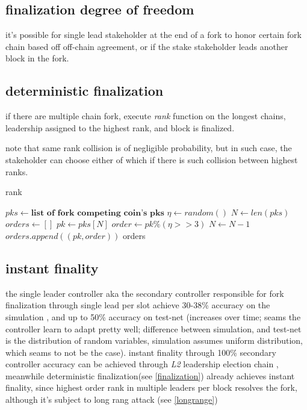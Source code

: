 \documentclass[a4paper]{article}
\begin{document}
\subsection {finalization degree of freedom}
it's possible for single lead stakeholder at the end of a fork to honor certain fork chain based off off-chain agreement, or if the stake stakeholder leads another block in the fork.

\label{finalization}
\subsection {deterministic finalization}
if there are multiple chain fork, execute \emph{rank} function on the longest chains, leadership assigned to the highest rank, and block is finalized.

note that same rank collision is of negligible probability, but in such case, the stakeholder can choose either of which if there is such collision between highest ranks.


\begin{algorithm}
\caption{rank}\label{alg:cap}
\begin{algorithmic}

\State $pks \gets \textbf{list of fork competing coin's pks}$
\State $\eta \gets random()$ 
\State $N \gets len(pks)$
\State $orders \gets []$
\State $pk \gets pks[N]$
\State $order \gets pk \% (\eta >> 3) $
\State $N \gets N-1$
\State $orders.append((pk,order))$
\EndWhile
\State \Return orders
\end{algorithmic}
\end{algorithm}


\subsection {instant finality}
the single leader controller aka the secondary controller responsible for fork finalization through single lead per slot achieve 30-38\% accuracy on the simulation \cite{lotterysim}, and up to 50\% accuracy on test-net (increases over time; seams the controller learn to adapt pretty well; difference between simulation, and test-net is the distribution of random variables, simulation assumes uniform distribution, which seams to not be the case).
instant finality through 100\% secondary controller accuracy can be achieved through \emph{L2} leadership election chain \cite{khonsu}, meanwhile deterministic finalization(see \ref{finalization}) already achieves instant finality, since highest order rank in multiple leaders per block resolves the fork, although it's subject to long rang attack (see \ref{longrange})
\end{document}
